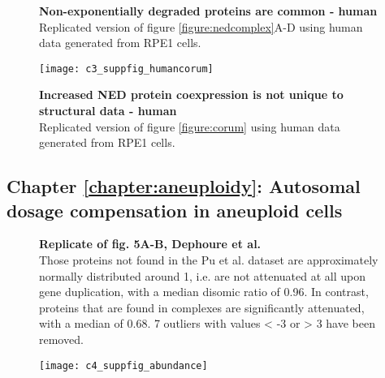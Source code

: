 \documentclass[a4paper,11pt,twoside,openright]{scrbook}
\begin{document}
\begin{figure}
    \caption[Non-exponentially degraded proteins are common - human]{\sffamily
    \textbf{Non-exponentially degraded proteins are common - human} \\ \small
    Replicated version of figure \ref{figure:nedcomplex}A-D using human data
    generated from RPE1 cells.} \label{suppfigure:human} \end{figure}

\begin{figure} \texttt{[image: c3\_suppfig\_humancorum]}
    \caption[Increased NED protein coexpression is not unique to structural data
    - human]{\sffamily \textbf{Increased NED protein coexpression is not unique
    to structural data - human} \\ \small Replicated version of figure
    \ref{figure:corum} using human data generated from RPE1 cells.}
\label{figure:humancorum} \end{figure}

\clearpage

\subsection{Chapter \ref*{chapter:aneuploidy}: Autosomal dosage compensation in
aneuploid cells}

\vspace{55mm}

\begin{figure}[h] 
        \caption[Replicate of fig. 5A-B, Dephoure et al.]{\sffamily
        \textbf{Replicate of fig. 5A-B, Dephoure et al.} \\ \small Those
        proteins not found in the Pu et al. \cite{Pu2009} dataset are
        approximately normally distributed around 1, i.e. are not attenuated at
        all upon gene duplication, with a median disomic ratio of 0.96. In
        contrast, proteins that are found in complexes are significantly
        attenuated, with a median of 0.68. 7 outliers with values < -3 or > 3
        have been removed.} \label{suppfigure:aneuploidy_qstype} \end{figure}

\begin{figure}[h] 
{\texttt{[image: c4\_suppfig\_abundance]}} \end{figure}
\end{document}
